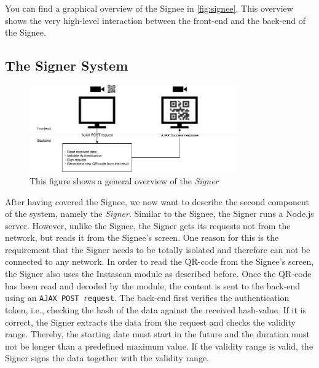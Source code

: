 You can find a graphical overview of the Signee in \autoref{fig:signee}. This overview shows the very high-level interaction between the front-end and the back-end of the Signee.


\subsection{The Signer System}

\begin{figure}
\centering
\includegraphics[width=0.8\textwidth]{images/Signer.png}
\caption{This figure shows a general overview of the \emph{Signer}}
\label{fig:signer}
\end{figure}

After having covered the Signee, we now want to describe the second component of the system, namely the \emph{Signer}. Similar to the Signee, the Signer runs a Node.js server. However, unlike the Signee, the Signer gets its requests not from the network, but reads it from the Signee's screen. One reason for this is the requirement that the Signer needs to be totally isolated and therefore can not be connected to any network. In order to read the QR-code from the Signee's screen, the Signer also uses the Instascan module as described before. Once the QR-code has been read and decoded by the module, the content is sent to the back-end using an \texttt{AJAX POST request}. The back-end first verifies the authentication token, i.e., checking the hash of the data against the received hash-value. If it is correct, the Signer extracts the data from the request and checks the validity range. Thereby, the starting date must start in the future and the duration must not be longer than a predefined maximum value. If the validity range is valid, the Signer signs the data together with the validity range.

\begin{code}[caption={Expected message format from the Signer back to the Signee}, label={listing:signer_to_signee}]
{
    id: UNIQUE_ID,
    assertion: { data: DATA_TO_SIGN,
                 valid_from: DATE_IN_UTC_FORMAT,
                 valid_until: DATE_IN_UTC_FORMAT },
    signature: SIGNATURE_OF_ASSERTION },
}
\end{code}

